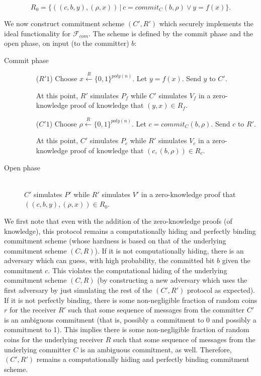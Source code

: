 \documentclass[draft]{article}
\newcommand{\getr}{\overset{R}{\gets}}
\newcommand{\getrsingle}{\getr\{0, 1\}}
\newcommand{\getrpoly}{\getrsingle^{poly(n)}}
\begin{document}
\begin{enumerate}
\begin{enumerate}
\begin{itemize}
      \begin{displaymath}
        R_0=\{((c, b, y), (\rho, x)) \,|\, c = commit_C(b, \rho) \lor y = f(x)\}.
      \end{displaymath}
    \end{itemize}
    We now construct commitment scheme $(C', R')$ which securely implements the ideal functionality for $\mathcal{F}_{com}$.
    The scheme is defined by the commit phase and the open phase, on input (to the committer) $b$:
    \begin{description}
    \item[Commit phase] \hfill
      \begin{enumerate}
      \item[($R'1$)]
        Choose $x\getrpoly$.
        Let $y = f(x)$.
        Send $y$ to $C'$.

        At this point, $R'$ simulates $P_f$ while $C'$ simulates $V_f$ in a zero-knowledge proof of knowledge that $(y, x)\in R_f$.
      \item[($C'1$)]
        Choose $\rho\getrpoly$.
        Let $c=commit_C(b, \rho)$.
        Send $c$ to $R'$.

        At this point, $C'$ simulates $P_c$ while $R'$ simulates $V_c$ in a zero-knowledge proof of knowledge that $(c, (b, \rho))\in R_c$.
      \end{enumerate}
    \item[Open phase] \hfill \\
      $C'$ simulates $P'$ while $R'$ simulates $V'$ in a zero-knowledge proof that $((c, b, y), (\rho, x))\in R_0$.
    \end{description}
    We first note that even with the addition of the zero-knowledge proofs (of knowledge), this protocol remains a computationally hiding and perfectly binding commitment scheme (whose hardness is based on that of the underlying commitment scheme $(C, R)$).
    If it is not computationally hiding, there is an adversary which can guess, with high probability, the committed bit $b$ given the commitment $c$.
    This violates the computational hiding of the underlying commitment scheme $(C, R)$ (by constructing a new adversary which uses the first adversary by just simulating the rest of the $(C', R')$ protocol as expected).
    If it is not perfectly binding, there is some non-negligible fraction of random coins $r$ for the receiver $R'$ such that some sequence of messages from the committer $C'$ is an ambiguous commitment (that is, possibly a commitment to 0 and possibly a commitment to 1).
    This implies there is some non-negligible fraction of random coins for the underlying receiver $R$ such that some sequence of messages from the underlying committer $C$ is an ambiguous commitment, as well.
    Therefore, $(C', R')$ remains a computationally hiding and perfectly binding commitment scheme.


\end{enumerate}
\end{enumerate}
\end{document}
